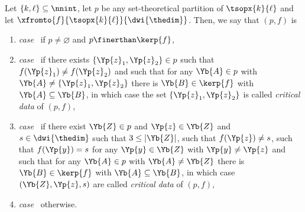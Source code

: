 \documentclass[pdftex]{sigma}
\numberwithin{equation}{section}
\begin{document}
  \begin{Definition}
  \newcommand{\inlen}{k}
  \newcommand{\outlen}{\ell}
  \newcommand{\theind}{f}
  \newcommand{\theindx}[1]{f(#1)}
  \newcommand{\thepoint}{\Yp{z}}
  \newcommand{\thevalue}{s}
  \newcommand{\thepartition}{p}
  \newcommand{\thelong}{\Yb{Z}}
  \newcommand{\firstspecialpoint}{\Yp{z}_1}
  \newcommand{\secondspecialpoint}{\Yp{z}_2}
  \newcommand{\anypoint}{\Yp{y}}
  \newcommand{\someblock}{\Yb{B}}
  \newcommand{\anyblock}{\Yb{A}}
    Let $\{\inlen,\outlen\}\subseteq \nnint$, let $\thepartition$ be any set-theoretical partition of $\tsopx{\inlen}{\outlen}$ and let $\xfromto{\theind}{\tsopx{\inlen}{\outlen}}{\dwi{\thedim}}$. Then, we say that $(\thepartition,\theind)$ is
    \begin{enumerate}
    \item \emph{case~\scenarioone{}} if $\thepartition\neq \varnothing$ and $\thepartition\finerthan\kerp{\theind}$,
    \item \emph{case~\scenariotwo{}} if there exists $\{\firstspecialpoint,\secondspecialpoint\}\in\thepartition$  such that $\theindx{\firstspecialpoint}\neq\theindx{\secondspecialpoint}$ and such that for any $\anyblock\in\thepartition$ with $\anyblock\neq \{\firstspecialpoint,\secondspecialpoint\}$ there is $\someblock\in\kerp{\theind}$ with $\anyblock\subseteq \someblock$, in which case the set $\{\firstspecialpoint,\secondspecialpoint\}$ is called \emph{critical data} of $(\thepartition,\theind)$,
    \item \emph{case~\scenariothree{}} if there exist $\thelong\in\thepartition$ and $\thepoint\in\thelong$ and $\thevalue\in\dwi{\thedim}$ such that $3\leq |\thelong|$, such that $\theindx{\thepoint}\neq \thevalue$, such that $\theindx{\anypoint}= \thevalue$ for any $\anypoint\in\thelong$ with $\anypoint\neq \thepoint$ and such that for any $\anyblock\in\thepartition$ with $\anyblock\neq \thelong$ there is $\someblock\in\kerp{\theind}$ with $\anyblock\subseteq \someblock$, in which case  $(\thelong, \thepoint,\thevalue)$ are called \emph{critical data} of $(\thepartition,\theind)$,
    \item \emph{case~\scenariofour{}} otherwise.
    \end{enumerate}
  \end{Definition}
\end{document}
